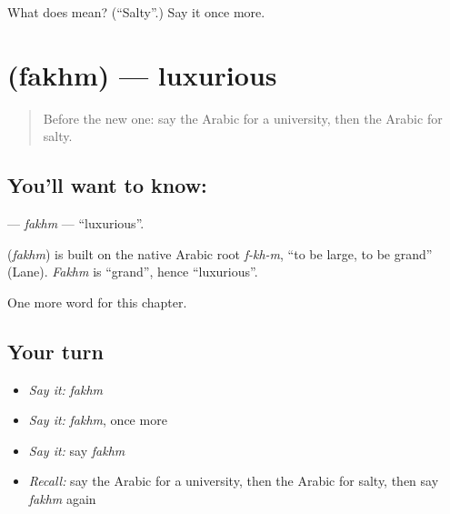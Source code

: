 \begin{tcolorbox}[breakable,colback=teal!4,colframe=teal!35!black,title={Before you move on}]
What does  mean? (\textquotedblleft{}Salty\textquotedblright{}.) Say it once more.
\end{tcolorbox}
\section[\texorpdfstring{\ar{فخم} (fakhm)}{فخم (fakhm)}]{ (fakhm) — luxurious}

\label{lesson:AR-C145-fakhm}



\begin{quote}
Before the new one: say the Arabic for a university, then the Arabic for salty.
\end{quote}

\subsection*{You'll want to know: }
\textbf{} — \emph{fakhm} — \textquotedblleft{}luxurious\textquotedblright{}.

\begin{cousinweb}
\textbf{} (\emph{fakhm}) is built on the native Arabic root \emph{f-kh-m}, \textquotedblleft{}to be large, to be grand\textquotedblright{} (Lane). \emph{Fakhm} is \textquotedblleft{}grand\textquotedblright{}, hence \textquotedblleft{}luxurious\textquotedblright{}.
\end{cousinweb}

\begin{grammarlens}[title={What you've built}]
One more word for this chapter.
\end{grammarlens}

\subsection*{Your turn}
\begin{itemize}
\raggedright
  \item \emph{Say it:} \emph{fakhm}
  \item \emph{Say it:} \emph{fakhm}, once more
  \item \emph{Say it:} say \emph{fakhm}
  \item \emph{Recall:} say the Arabic for a university, then the Arabic for salty, then say \emph{fakhm} again
\end{itemize}

